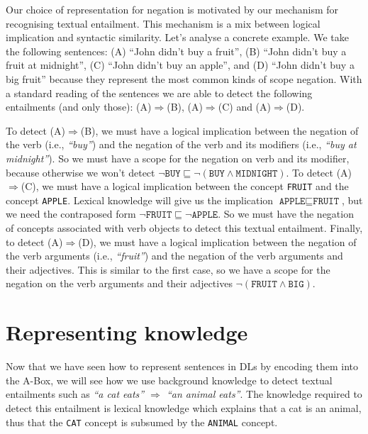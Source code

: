 \documentclass{esslli}
\newcommand{\dl}[1]{\texttt{#1}}
\begin{document}
Our choice of representation for negation is motivated by our
mechanism for recognising textual entailment. This mechanism is a mix
between logical implication and syntactic similarity. Let's analyse a
concrete example.  We take the following sentences: (A) ``John didn't
buy a fruit'', (B) ``John didn't buy a fruit at midnight'', (C) ``John
didn't buy an apple'', and (D) ``John didn't buy a big fruit'' because
they represent the most common kinds of scope negation.  With a
standard reading of the sentences we are able to detect the following
entailments (and only those): (A)$\Rightarrow$(B), (A)$\Rightarrow$(C)
and (A)$\Rightarrow$(D).

To detect (A)$\Rightarrow$(B), we must have a logical implication
between the negation of the verb (i.e., \emph{``buy''}) and the
negation of the verb and its modifiers (i.e., \emph{``buy at
midnight''}). So we must have a scope for the negation on verb and its
modifier, because otherwise we won't detect $\neg\dl{BUY} \sqsubseteq
\neg (\dl{BUY} \wedge \dl{MIDNIGHT})$.  To detect (A)$\Rightarrow$(C),
we must have a logical implication between the concept \dl{FRUIT} and
the concept \dl{APPLE}. Lexical knowledge will give us the implication
$\dl{APPLE} \sqsubseteq \dl{FRUIT}$, but we need the contraposed form
$\neg\dl{FRUIT} \sqsubseteq \neg\dl{APPLE}$. So we must have the
negation of concepts associated with verb objects to detect this
textual entailment.  Finally, to detect (A)$\Rightarrow$(D), we must
have a logical implication between the negation of the verb arguments
(i.e., \emph{``fruit''}) and the negation of the verb arguments and
their adjectives. This is similar to the first case, so we have a
scope for the negation on the verb arguments and their adjectives
$\neg (\dl{FRUIT} \wedge \dl{BIG})$.

\section{Representing knowledge}
Now that we have seen how to represent sentences in DLs by encoding
them into the A-Box, we will see how we use background knowledge to
detect textual entailments such as \emph{``a cat eats'' $\Rightarrow$
  ``an animal eats''}. The knowledge required to detect this
entailment is lexical knowledge which explains that a cat is an
animal, thus that the \dl{CAT} concept is subsumed by the \dl{ANIMAL}
concept.

\newcommand{\se}[1]{\textsc{#1}}
\end{document}
